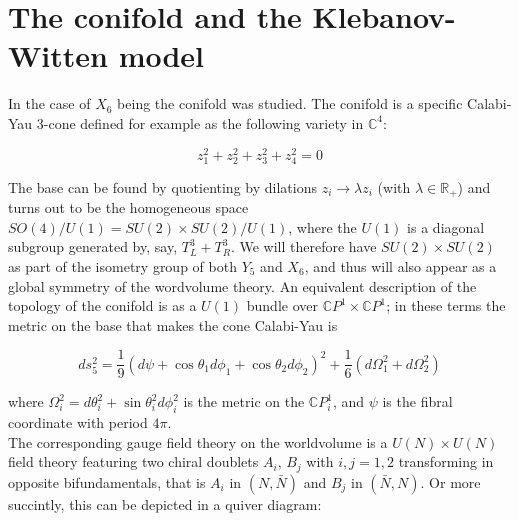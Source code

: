 
\section{The conifold and the Klebanov-Witten model}

In \cite{KW_SCFT} the case of $X_6$ being the conifold was studied. The conifold is a specific Calabi-Yau 3-cone defined for example as the following variety in $\mathbb{C}^4$:

\begin{equation}
	z_1^2 + z_2^2 + z_3^2 + z_4^2 = 0
\end{equation}

The base can be found by quotienting by dilations $z_i \rightarrow \lambda z_i$ (with $\lambda \in \mathbb{R}_+$) and turns out to be the homogeneous space $SO(4)/U(1) = SU(2)\times SU(2) / U(1)$, where the $U(1)$ is a diagonal subgroup generated by, say, $T^3_L + T^3_R$. We will therefore have $SU(2)\times SU(2)$ as part of the isometry group of both $Y_5$ and $X_6$, and thus will also appear as a global symmetry of the wordvolume theory. An equivalent description of the topology of the conifold is as a $U(1)$ bundle over $\mathbb{C}P^1 \times \mathbb{C}P^1$; in these terms the metric on the base that makes the cone Calabi-Yau is

\begin{equation}
	ds^2_5 = \frac{1}{9} (d\psi + \cos\theta_1 d\phi_1 + \cos\theta_2 d\phi_2)^2 + \frac{1}{6} (d\Omega_1^2 + d\Omega_2^2)
\end{equation}

where $\Omega_i^2 = d\theta_i^2 + \sin\theta_i^2 d\phi_i^2$ is the metric on the $\mathbb{C}P^1_i$, and $\psi$ is the fibral coordinate with period $4\pi$.\\

The corresponding gauge field theory on the worldvolume is a $U(N)\times U(N)$ field theory featuring two chiral doublets $A_i$, $B_j$ with $i,j = 1,2$ transforming in opposite bifundamentals, that is $A_i$ in $(N,\bar N)$ and $B_j$ in $(\bar N, N)$. Or more succintly, this can be depicted in a quiver diagram:

\begin{figure}[!h]
	\centering
{}
\end{figure}

